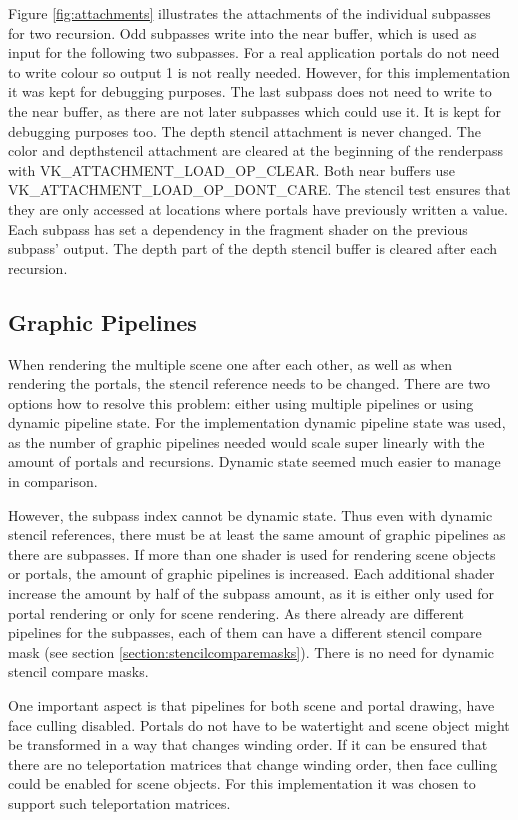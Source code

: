 Figure \ref{fig:attachments} illustrates the attachments of the individual subpasses for two recursion. Odd subpasses write into the near buffer, which is used as input for the following two subpasses. For a real application portals do not need to write colour so output 1 is not really needed. However, for this implementation it was kept for debugging purposes.
The last subpass does not need to write to the near buffer, as there are not later subpasses which could use it. It is kept for debugging purposes too. The depth stencil attachment is never changed. The color and depthstencil attachment are cleared at the beginning of the renderpass with VK\_ATTACHMENT\_LOAD\_OP\_CLEAR. Both near buffers use VK\_ATTACHMENT\_LOAD\_OP\_DONT\_CARE. The stencil test ensures that they are only accessed at locations where portals have previously written a value. Each subpass has set a dependency in the fragment shader on the previous subpass' output. The depth part of the depth stencil buffer is cleared after each recursion.


\subsection{Graphic Pipelines}
When rendering the multiple scene one after each other, as well as when rendering the portals, the stencil reference needs to be changed. There are two options how to resolve this problem: either using multiple pipelines or using dynamic pipeline state. For the implementation dynamic pipeline state was used, as the number of graphic pipelines needed would scale super linearly with the amount of portals and recursions. Dynamic state seemed much easier to manage in comparison.

However, the subpass index cannot be dynamic state. Thus even with dynamic stencil references, there must be at least the same amount of graphic pipelines as there are subpasses. If more than one shader is used for rendering scene objects or portals, the amount of graphic pipelines is increased. Each additional shader increase the amount by half of the subpass amount, as it is either only used for portal rendering or only for scene rendering. As there already are different pipelines for the subpasses, each of them can have a different stencil compare mask (see section \ref{section:stencilcomparemasks}). There is no need for dynamic stencil compare masks.

One important aspect is that pipelines for both scene and portal drawing, have face culling disabled. Portals do not have to be watertight and scene object might be transformed in a way that changes winding order. If it can be ensured that there are no teleportation matrices that change winding order, then face culling could be enabled for scene objects. For this implementation it was chosen to support such teleportation matrices.

